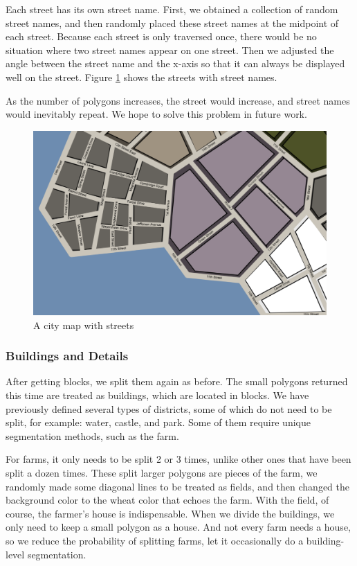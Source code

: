 Each street has its own street name. First, we obtained a collection of random street names, and then randomly placed these street names at the midpoint of each street. Because each street is only traversed once, there would be no situation where two street names appear on one street. Then we adjusted the angle between the street name and the x-axis so that it can always be displayed well on the street. Figure \ref{fig:streets} shows the streets with street names.

As the number of polygons increases, the street would increase, and street names would inevitably repeat. We hope to solve this problem in future work.

\begin{figure}[htbp]
  \includegraphics[width=\textwidth]{section04/assets/Map-blocks-streets.png}
  \caption{A city map with streets}
  \label{fig:streets}
\end{figure}

\subsubsection{Buildings and Details}
After getting blocks, we split them again as before. The small polygons returned this time are treated as buildings, which are located in blocks. We have previously defined several types of districts, some of which do not need to be split, for example: water, castle, and park. Some of them require unique segmentation methods, such as the farm.

For farms, it only needs to be split 2 or 3 times, unlike other ones that have been split a dozen times. These split larger polygons are pieces of the farm, we randomly made some diagonal lines to be treated as fields, and then changed the background color to the wheat color that echoes the farm. With the field, of course, the farmer’s house is indispensable. When we divide the buildings, we only need to keep a small polygon as a house. And not every farm needs a house, so we reduce the probability of splitting farms, let it occasionally do a building-level segmentation.

